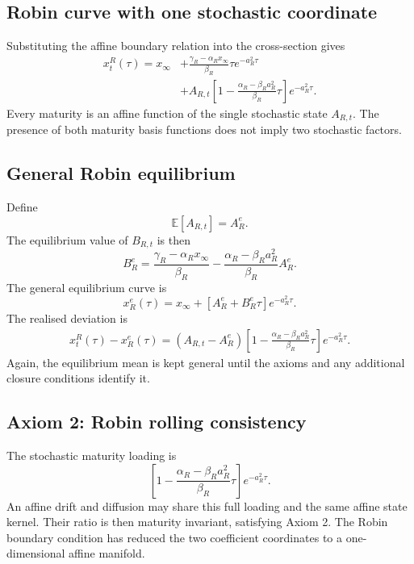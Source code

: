 \documentclass[12pt]{article}
\numberwithin{equation}{subsection}
\newcommand{\E}{\mathbb{E}}
\begin{document}
\subsection{Robin curve with one stochastic coordinate}

Substituting the affine boundary relation into the cross-section gives
\begin{equation}
\begin{aligned}
x^R_t(\tau)
=
x_\infty
&+
\frac{\gamma_R-\alpha_Rx_\infty}{\beta_R}\tau e^{-a_R^2\tau}
\\
&+
A_{R,t}
\left[
1-
\frac{\alpha_R-\beta_Ra_R^2}{\beta_R}\tau
\right]e^{-a_R^2\tau}.
\end{aligned}
\end{equation}
Every maturity is an affine function of the single stochastic state $A_{R,t}$. The presence of both maturity basis functions does not imply two stochastic factors.

\subsection{General Robin equilibrium}

Define
\begin{equation}
\E[A_{R,t}]=A_R^e.
\end{equation}
The equilibrium value of $B_{R,t}$ is then
\begin{equation}
B_R^e
=
\frac{\gamma_R-\alpha_Rx_\infty}{\beta_R}
-
\frac{\alpha_R-\beta_Ra_R^2}{\beta_R}A_R^e.
\end{equation}
The general equilibrium curve is
\begin{equation}
x_R^e(\tau)
=
x_\infty+
\left[A_R^e+B_R^e\tau\right]e^{-a_R^2\tau}.
\end{equation}
The realised deviation is
\begin{equation}
\begin{aligned}
x^R_t(\tau)-x_R^e(\tau)
=
(A_{R,t}-A_R^e)
\left[
1-
\frac{\alpha_R-\beta_Ra_R^2}{\beta_R}\tau
\right]e^{-a_R^2\tau}.
\end{aligned}
\end{equation}
Again, the equilibrium mean is kept general until the axioms and any additional closure conditions identify it.

\subsection{Axiom 2: Robin rolling consistency}

The stochastic maturity loading is
\begin{equation}
\left[
1-
\frac{\alpha_R-\beta_Ra_R^2}{\beta_R}\tau
\right]e^{-a_R^2\tau}.
\end{equation}
An affine drift and diffusion may share this full loading and the same affine state kernel. Their ratio is then maturity invariant, satisfying Axiom 2. The Robin boundary condition has reduced the two coefficient coordinates to a one-dimensional affine manifold.
\end{document}
